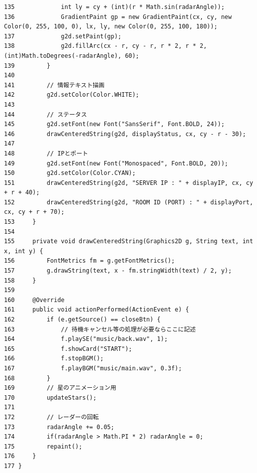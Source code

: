 \documentclass[11pt,a4j]{jarticle}
\begin{document}
\begin{small}
\begin{verbatim}
135             int ly = cy + (int)(r * Math.sin(radarAngle));
136             GradientPaint gp = new GradientPaint(cx, cy, new Color(0, 255, 100, 0), lx, ly, new Color(0, 255, 100, 180));
137             g2d.setPaint(gp);
138             g2d.fillArc(cx - r, cy - r, r * 2, r * 2, (int)Math.toDegrees(-radarAngle), 60);
139         }
140 
141         // 情報テキスト描画
142         g2d.setColor(Color.WHITE);
143 
144         // ステータス
145         g2d.setFont(new Font("SansSerif", Font.BOLD, 24));
146         drawCenteredString(g2d, displayStatus, cx, cy - r - 30);
147 
148         // IPとポート
149         g2d.setFont(new Font("Monospaced", Font.BOLD, 20));
150         g2d.setColor(Color.CYAN);
151         drawCenteredString(g2d, "SERVER IP : " + displayIP, cx, cy + r + 40);
152         drawCenteredString(g2d, "ROOM ID (PORT) : " + displayPort, cx, cy + r + 70);
153     }
154 
155     private void drawCenteredString(Graphics2D g, String text, int x, int y) {
156         FontMetrics fm = g.getFontMetrics();
157         g.drawString(text, x - fm.stringWidth(text) / 2, y);
158     }
159 
160     @Override
161     public void actionPerformed(ActionEvent e) {
162         if (e.getSource() == closeBtn) {
163             // 待機キャンセル等の処理が必要ならここに記述
164             f.playSE("music/back.wav", 1);
165             f.showCard("START");
166             f.stopBGM();
167             f.playBGM("music/main.wav", 0.3f);
168         }
169         // 星のアニメーション用
170         updateStars();
171 
172         // レーダーの回転
173         radarAngle += 0.05;
174         if(radarAngle > Math.PI * 2) radarAngle = 0;
175         repaint();
176     }
177 }
\end{verbatim}
\end{small}
\end{document}
